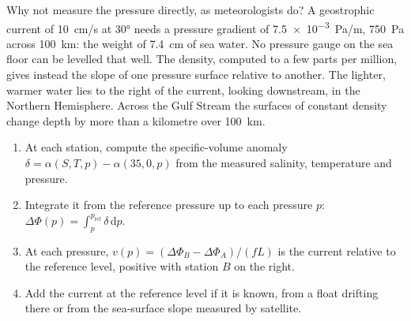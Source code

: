 Why not measure the pressure directly, as meteorologists do? A geostrophic
current of \qty{10}{cm/s} at \ang{30} needs a pressure gradient of
\qty{7.5e-3}{Pa/m}, \qty{750}{Pa} across \qty{100}{km}: the weight of
\qty{7.4}{cm} of sea water. No pressure gauge on the sea floor can be
levelled that well. The density, computed to a few parts per million,
gives instead the slope of one pressure surface relative to another. The
lighter, warmer water lies to the right of the current, looking downstream,
in the Northern Hemisphere. Across the Gulf Stream the surfaces of constant
density change depth by more than a kilometre over \qty{100}{km}.

\begin{method}\label{met:b3:ocean-dynamics:dynamic}
\begin{enumerate}
\item At each station, compute the specific-volume anomaly $\delta =
  \alpha(S, T, p) - \alpha(35, 0, p)$ from the measured salinity,
  temperature and pressure.
\item Integrate it from the reference pressure up to each pressure $p$:
  $\Delta\Phi(p) = \int_p^{p_{\text{ref}}}\delta\,\mathrm dp$.
\item At each pressure, $v(p) = (\Delta\Phi_B - \Delta\Phi_A)/(fL)$ is
  the current relative to the reference level, positive with station $B$
  on the right.
\item Add the current at the reference level if it is known, from a float
  drifting there or from the sea-surface slope measured by satellite.
\end{enumerate}
\end{method}

